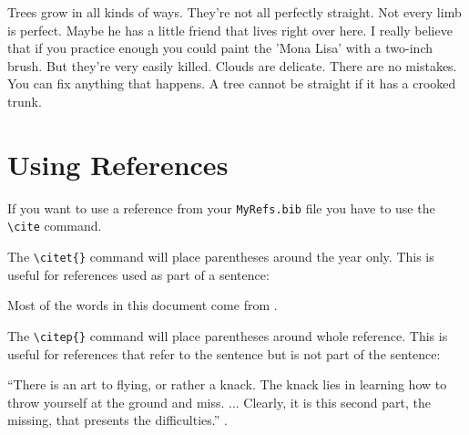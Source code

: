 \documentclass[twocolumn]{aastex63}
\begin{document}
Trees grow in all kinds of ways. They're not all perfectly straight. Not
every limb is perfect. Maybe he has a little friend that lives right
over here. I really believe that if you practice enough you could paint
the 'Mona Lisa' with a two-inch brush. But they're very easily killed.
Clouds are delicate. There are no mistakes. You can fix anything that
happens. A tree cannot be straight if it has a crooked trunk.


\section{Using References}

If you want to use a reference from your \texttt{MyRefs.bib} file you have to use the \texttt{\textbackslash cite} command.

\vspace{1em}

The \texttt{\textbackslash citet\{\}} command will place parentheses around the year only. This is useful for references used as part of a sentence:

\vspace{1em}

Most of the words in this document come from \citet{1983Sci...220.1339R}.

\vspace{1em}

The \texttt{\textbackslash citep\{\}} command will place parentheses around whole reference. This is useful for references that refer to the sentence but is not part of the sentence:

\vspace{1em}

``There is an art to flying, or rather a knack. The knack lies in learning how to throw yourself at the ground and miss. ... Clearly, it is this second part, the missing, that presents the difficulties.''
 \citep{adams1979hitchhiker}.
 \citep{2006DPS....38.3703J}
 


\end{document}
